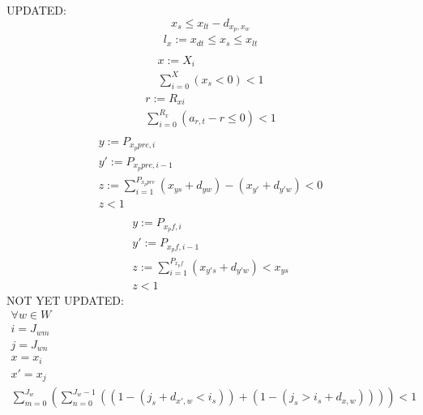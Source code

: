 \documentclass[a4paper,12pt,twoside]{scrreprt}
\begin{document}
\begin{flushleft}
	UPDATED:\linebreak
	\begin{equation}
	\label{not_late}
		x_{s} \leq x_{lt} - d_{x_{p}, x_{w}}
	\end{equation}
	\begin{equation}
		\label{check_tardiness}
		\begin{split}
			l_{x} := x_{dt} \leq x_{s} \leq x_{lt} \\
		\end{split}
	\end{equation}
	\begin{equation}
	\label{only_legal_timeslots}
	\begin{split}
		x := X_{i} \\
		\sum_{i=0}^{X} (x_{s} < 0) < 1
	\end{split}
	\end{equation}
	\begin{equation}
	\label{sufficient_resources}
	\begin{split}
		r := R_{xi} \\
		\sum_{i=0}^{R_{x}}(a_{r,t}-r\leq 0) < 1\\
	\end{split}
	\end{equation}
	\begin{equation}
	\label{no_early_start}
	\begin{split}
		y := P_{x_{p}pre, i} \\
		y' := P_{x_{p}pre, i-1} \\
		z := \sum_{i=1}^{P_{x_{p}pre}} (x_{ys} + d_{yw}) - (x_{y'} + d_{y'w}) < 0 \\
		z < 1 \\
	\end{split}
	\end{equation}
	\begin{equation}
	\label{follow_up_tasks_early_start}
	\begin{split}
		y := P_{x_{p}f, i}\\
		y' := P_{x_{p}f, i-1}\\
		z := \sum_{i=1}^{P_{x_{p}f}} (x_{y's} + d_{y'w}) < x_{ys}\\
		z < 1
	\end{split}
	\end{equation}
	NOT YET UPDATED:\linebreak
	\begin{equation}
	\label{no_multiple_workstation_occupations}
	\begin{split}
		\forall w \in W \\
		i = J_{wm} \\
		j = J_{wn} \\
		x = x_{i} \\
		x' = x_{j} \\
		\sum_{m=0}^{J_{w}} (\sum_{n = 0}^{J_{w}-1}((1-(j_{s} + d_{x',w} < i_{s})) + (1-(j_{s} > i_{s} + d_{x,w})))) < 1
	\end{split}
	\end{equation}


\end{flushleft}
\end{document}
